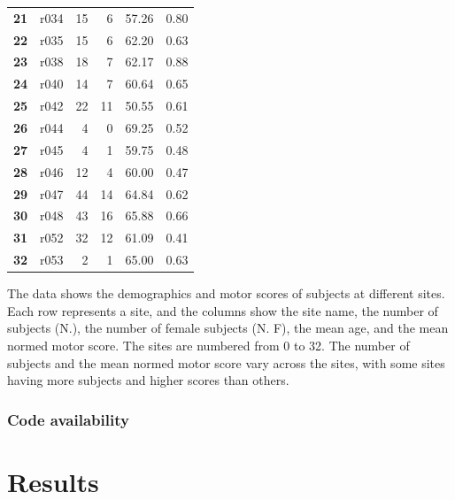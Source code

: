 \documentclass[10pt]{article}
\begin{document}
\begin{tabular}{|l|l|r|r|r|r|}
\textbf{21} &  r034 &  15 &          6 &     57.26 &               0.80 \\ 
\textbf{22} &  r035 &  15 &          6 &     62.20 &               0.63 \\ 
\textbf{23} &  r038 &  18 &          7 &     62.17 &               0.88 \\ 
\textbf{24} &  r040 &  14 &          7 &     60.64 &               0.65 \\ 
\textbf{25} &  r042 &  22 &         11 &     50.55 &               0.61 \\ 
\textbf{26} &  r044 &   4 &          0 &     69.25 &               0.52 \\ 
\textbf{27} &  r045 &   4 &          1 &     59.75 &               0.48 \\ 
\textbf{28} &  r046 &  12 &          4 &     60.00 &               0.47 \\ 
\textbf{29} &  r047 &  44 &         14 &     64.84 &               0.62 \\
\textbf{30} &  r048 &  43 &         16 &     65.88 &               0.66 \\ 
\textbf{31} &  r052 &  32 &         12 &     61.09 &               0.41 \\ 
\textbf{32} &  r053 &   2 &          1 &     65.00 &               0.63 \\ 
\hline
\end{tabular}
The data shows the demographics and motor scores of subjects at different sites. Each row represents a site, and the columns show the site name, the number of subjects (N.), the number of female subjects (N. F), the mean age, and the mean normed motor score. The sites are numbered from 0 to 32. The number of subjects and the mean normed motor score vary across the sites, with some sites having more subjects and higher scores than others.


\subsubsection*{Code availability}

\section{Results}
\end{document}

